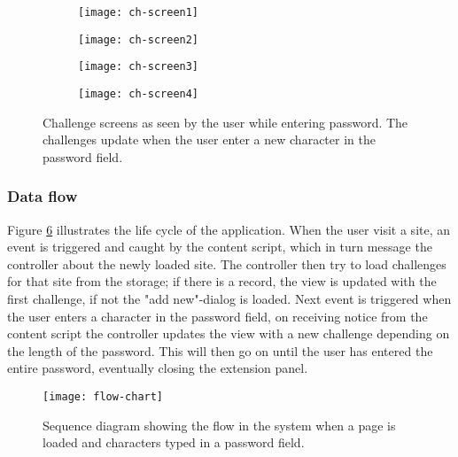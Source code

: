 \begin{figure}
    \centering
    \begin{subfigure}[t]{0.45\textwidth}
        \centering
        \texttt{[image: ch-screen1]} 
        \caption{}
        \label{challenge-screen1}
    \end{subfigure}
    \hfill
    \begin{subfigure}[t]{0.45\textwidth}
        \centering
        \texttt{[image: ch-screen2]} 
        \caption{}
        \label{challenge-screen2}
    \end{subfigure}
    \hfill
    \begin{subfigure}[t]{0.45\textwidth}
        \centering
        \texttt{[image: ch-screen3]} 
        \caption{}
        \label{challenge-screen2}
    \end{subfigure}
    \hfill
    \begin{subfigure}[t]{0.45\textwidth}
        \centering
        \texttt{[image: ch-screen4]} 
        \caption{}
        \label{challenge-screen2}
    \end{subfigure}
    \caption{Challenge screens as seen by the user while entering password. The challenges update when the user enter a new character in the password field.}
    \label{ch-screens}
\end{figure}

\newpage

\subsubsection{Data flow}\label{data-flow}
Figure \ref{flow-chart} illustrates the life cycle of the application. When the user visit a site, an event is triggered and caught by the content script, which in turn message the controller about the newly loaded site. The controller then try to load challenges for that site from the storage; if there is a record, the view is updated with the first challenge, if not the "add new"-dialog is loaded. Next event is triggered when the user enters a character in the password field, on receiving notice from the content script the controller updates the view with a new challenge depending on the length of the password. This will then go on until the user has entered the entire password, eventually closing the extension panel.
\begin{figure}
    \centering
    \texttt{[image: flow-chart]} 
    \caption{Sequence diagram showing the flow in the system when a page is loaded and characters typed in a password field.}
    \label{flow-chart}
\end{figure}

